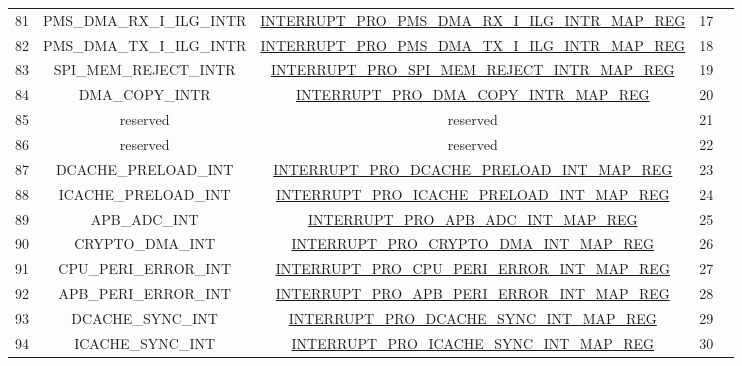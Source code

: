\begin{footnotesize}
\begin{longtable}[c]{|*{5}{c|}}
    81 &PMS\_DMA\_RX\_I\_ILG\_INTR  &\hyperref[regdesc:INTERRUPTPROPMSDMARXIILGINTRMAPREG]{INTERRUPT\_PRO\_PMS\_DMA\_RX\_I\_ILG\_INTR\_MAP\_REG}  &17  &                          	\\
    \cline{1-4}
    82 &PMS\_DMA\_TX\_I\_ILG\_INTR  &\hyperref[regdesc:INTERRUPTPROPMSDMATXIILGINTRMAPREG]{INTERRUPT\_PRO\_PMS\_DMA\_TX\_I\_ILG\_INTR\_MAP\_REG}  &18  &                          	\\
    \cline{1-4}
    83 &SPI\_MEM\_REJECT\_INTR  &\hyperref[regdesc:INTERRUPTPROSPIMEMREJECTINTRMAPREG]{INTERRUPT\_PRO\_SPI\_MEM\_REJECT\_INTR\_MAP\_REG}  &19  &                          	\\
    \cline{1-4}
    84 &DMA\_COPY\_INTR  &\hyperref[regdesc:INTERRUPTPRODMACOPYINTRMAPREG]{INTERRUPT\_PRO\_DMA\_COPY\_INTR\_MAP\_REG}  &20  &                          	\\
    \cline{1-4}
    85 &reserved  &reserved  &21  &                          	\\
    \cline{1-4}
    86 & reserved  &reserved &22  &                          	\\
    \cline{1-4}
    87 &DCACHE\_PRELOAD\_INT  &\hyperref[regdesc:INTERRUPTPRODCACHEPRELOADINTMAPREG]{INTERRUPT\_PRO\_DCACHE\_PRELOAD\_INT\_MAP\_REG}  &23  &                          	\\
    \cline{1-4}
    88 &ICACHE\_PRELOAD\_INT  &\hyperref[regdesc:INTERRUPTPROICACHEPRELOADINTMAPREG]{INTERRUPT\_PRO\_ICACHE\_PRELOAD\_INT\_MAP\_REG}  &24  &                          	\\
    \cline{1-4}
    89 &APB\_ADC\_INT  &\hyperref[regdesc:INTERRUPTPROAPBADCINTMAPREG]{INTERRUPT\_PRO\_APB\_ADC\_INT\_MAP\_REG}  &25  &                          	\\
    \cline{1-4}
    90 &CRYPTO\_DMA\_INT  &\hyperref[regdesc:INTERRUPTPROCRYPTODMAINTMAPREG]{INTERRUPT\_PRO\_CRYPTO\_DMA\_INT\_MAP\_REG}  &26  &                          	\\
    \cline{1-4}
    91 &CPU\_PERI\_ERROR\_INT  &\hyperref[regdesc:INTERRUPTPROCPUPERIERRORINTMAPREG]{INTERRUPT\_PRO\_CPU\_PERI\_ERROR\_INT\_MAP\_REG}  &27  &                          	\\
    \cline{1-4}
    92 &APB\_PERI\_ERROR\_INT  &\hyperref[regdesc:INTERRUPTPROAPBPERIERRORINTMAPREG]{INTERRUPT\_PRO\_APB\_PERI\_ERROR\_INT\_MAP\_REG}  &28  &                          	\\
    \cline{1-4}
    93 &DCACHE\_SYNC\_INT  &\hyperref[regdesc:INTERRUPTPRODCACHESYNCINTMAPREG]{INTERRUPT\_PRO\_DCACHE\_SYNC\_INT\_MAP\_REG}   &29  &                          	\\
    \cline{1-4}
    94 &ICACHE\_SYNC\_INT  &\hyperref[regdesc:INTERRUPTPROICACHESYNCINTMAPREG]{INTERRUPT\_PRO\_ICACHE\_SYNC\_INT\_MAP\_REG}  &30  &                          	\\
    \hline
    



\end{longtable}
\end{footnotesize}
